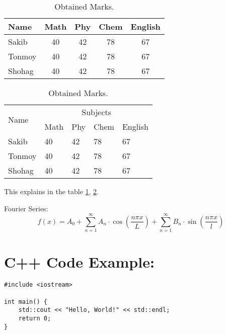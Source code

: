 \documentclass{article}
\begin{document}
\lipsum[1]

\begin{table}[!hbt]
    \centering
    \caption{Obtained Marks.}
    \label{tab-marks}

    \begin{tabular}{|l|c|c|c|c|}
        \hline Name   & Math & Phy & Chem & English \\
        \hline Sakib  & 40   & 42  & 78   & 67      \\
        \hline Tonmoy & 40   & 42  & 78   & 67      \\
        \hline Shohag & 40   & 42  & 78   & 67      \\
        \hline
    \end{tabular}

\end{table}

\lipsum[2]

\begin{table}[!hbt]
    \centering
    \caption{Obtained Marks.}
    \label{tab-marks-with-tabularx}

    \begin{tabularx}{0.8\linewidth} {|X|X|X|X|X|}
        \hline
        \multirow{2}{*}{Name} & \multicolumn{4}{c|}{Subjects}                        \\
        \cline{2-5}
                              & Math                          & Phy & Chem & English \\
        \hline
        Sakib                 & 40                            & 42  & 78   & 67      \\
        \hline
        Tonmoy                & 40                            & 42  & 78   & 67      \\
        \hline
        Shohag                & 40                            & 42  & 78   & 67      \\
        \hline
    \end{tabularx}

\end{table}
This explains in the table \ref{tab-marks}, \ref{tab-marks-with-tabularx}.

\vfil
Fourier Series:
\begin{equation}
    f(x) = A_0 + \sum_{n=1}^{\infty} A_n \cdot \cos{(\frac{n\pi x}{L})} + \sum_{n=1}^{\infty} B_n \cdot \sin{(\frac{n\pi x}{l})}
\end{equation}

\section*{C++ Code Example:}

\begin{lstlisting}[style=cppstyle, caption={Your C++ Code}, label={lst:cppcode}]
#include <iostream>

int main() {
    std::cout << "Hello, World!" << std::endl;
    return 0;
}
\end{lstlisting}
\end{document}
